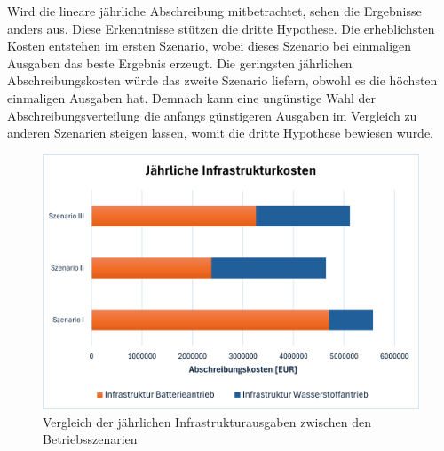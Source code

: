 %
Wird die lineare jährliche Abschreibung mitbetrachtet, sehen die Ergebnisse anders aus. 
Diese Erkenntnisse stützen die dritte Hypothese.
Die erheblichsten Kosten entstehen im ersten Szenario, 
wobei dieses Szenario bei einmaligen Ausgaben das beste Ergebnis erzeugt.
Die geringsten jährlichen Abschreibungskosten würde das zweite Szenario liefern, 
obwohl es die höchsten einmaligen Ausgaben hat. 
Demnach kann eine ungünstige Wahl der Abschreibungsverteilung die anfangs günstigeren Ausgaben 
im Vergleich zu anderen Szenarien steigen lassen, womit die dritte Hypothese bewiesen wurde.\\
%
\begin{figure}[h]
	\centering
	\includegraphics[width=0.8\linewidth]{Bilder/infr_abschreibung.png}
	\caption[Vergleich der jährlichen Infrastrukturausgaben zwischen den Betriebsszenarien]{Vergleich der jährlichen Infrastrukturausgaben zwischen den Betriebsszenarien}
	\label{res_betriebsszenarien}
\end{figure}

